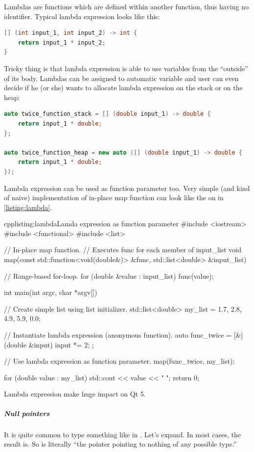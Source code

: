 Lambdas are functions which are defined within another function, thus having no identifier. Typical lambda expression looks like this:
\begin{lstlisting}[firstnumber=1,language=cpp]
[] (int input_1, int input_2) -> int {
	return input_1 * input_2;
}
\end{lstlisting}
Tricky thing is that lambda expression is able to use variables from the \enquote{outside} of its body. Lambdas can be assigned to automatic variable and user can even decide if he (or she) wants to allocate lambda expression on the stack or on the heap:
\begin{lstlisting}[firstnumber=1,language=cpp]
auto twice_function_stack = [] (double input_1) -> double {
	return input_1 * double;
};

auto twice_function_heap = new auto ([] (double input_1) -> double {
	return input_1 * double;
});
\end{lstlisting}
Lambda expression can be used as function parameter too. Very simple (and kind of naive) implementation of in-place map function can look like the on in \autoref{listing:lambda}.
\begin{fdoccode}{cpp}{listing:lambda}{Lamda expression as function parameter}
#include <iostream>
#include <functional>
#include <list>


// In-place map function.
// Executes func for each member of input_list
void map(const std::function<void(double&)> &func, std::list<double> &input_list) {

    // Range-based for-loop.
    for (double &value : input_list) {
		func(value);
    }
}

int main(int argc, char *argv[]) {
    // Create simple list using list initializer.
    std::list<double> my_list = {1.7, 2.8, 4.9, 5.9, 0.0};

    // Instantiate lambda expression (anonymous function).
    auto func_twice = [&] (double &input) {
		input *= 2;
    };

    // Use lambda expression as function parameter.
    map(func_twice, my_list);

    for (double value : my_list) {
		std::cout << value << " ";
    }
    return 0;
}
\end{fdoccode}
Lambda expression make huge impact on Qt 5.

\subparagraph*{Null pointers}
It is quite common to type something like in . Let's expand. In most cases, the result is. So is literally \enquote{the pointer pointing to nothing of any possible type.}

